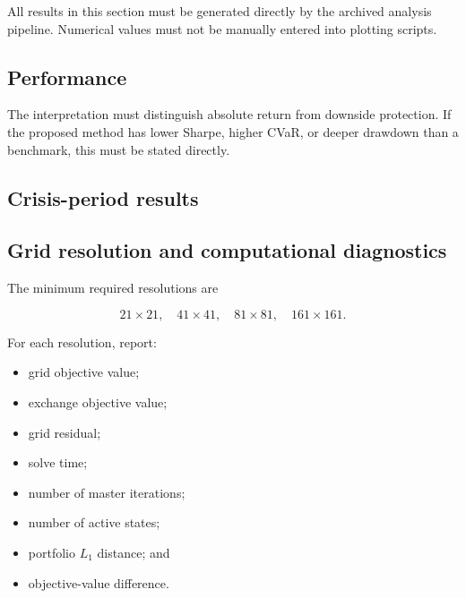 \documentclass[11pt,a4paper]{article}
\theoremstyle{definition}
\theoremstyle{remark}
\begin{document}
All results in this section must be generated directly by the archived
analysis pipeline. Numerical values must not be manually entered into plotting
scripts.

\subsection{Performance}


The interpretation must distinguish absolute return from downside protection.
If the proposed method has lower Sharpe, higher CVaR, or deeper drawdown than
a benchmark, this must be stated directly.

\subsection{Crisis-period results}


\subsection{Grid resolution and computational diagnostics}

The minimum required resolutions are

\[
21\times21,\quad
41\times41,\quad
81\times81,\quad
161\times161.
\]

For each resolution, report:

\begin{itemize}
    \item grid objective value;
    \item exchange objective value;
    \item grid residual;
    \item solve time;
    \item number of master iterations;
    \item number of active states;
    \item portfolio \(L_1\) distance; and
    \item objective-value difference.
\end{itemize}
\end{document}
